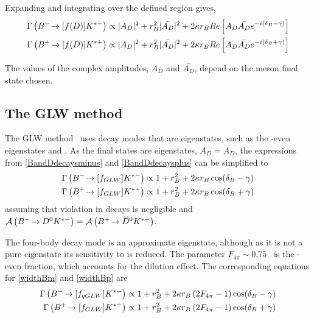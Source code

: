 Expanding and integrating over the defined \Kstar region gives,
\begin{align}
\Gamma\left({{{B}^-}}\!\rightarrow [f(D)]{\ensuremath{{K}^{*-}}}\right) &\propto |A_D|^2 + r_B^2 |\bar{A_{D}}|^2 + 2\kappa r_B Re\left[ A_D \bar{A_{D}} e^{-i(\delta_B - \gamma)} \right] \label{BandDdecaysminus} \\
\Gamma\left({{{B}^+}}\!\rightarrow [f(D)]{\ensuremath{{K}^{*+}}}\right) &\propto |A_D|^2 + r_B^2 |\bar{A_{D}}|^2 + 2\kappa r_B Re\left[ A_D \bar{A_{D}} e^{-i(\delta_B + \gamma)} \right] \label{BandDdecaysplus}
\end{align}

The values of the complex amplitudes, $A_{D}$ and $\bar{A_{D}}$, depend on the \D meson final state chosen.

\subsection{The GLW method}
\label{sec:theory:glw}

The GLW method~\cite{GL,GW} uses \D decay modes that are \CP eigenstates, such as the \CP-even eigenstates \decay{\D}{\Kp\Km} and \decay{\D}{\pip\pim}. As the final states are \CP eigenstates, $A_{D} = \bar{A_{D}}$, the expressions from \eqn\ref{BandDdecaysminus} and \ref{BandDdecaysplus} can be simplified to
\begin{align}
\Gamma\left({{{B}^-}}\!\rightarrow [f_{GLW}]{\ensuremath{{K}^{*-}}}\right) &\propto 1 + r_B^2 + 2\kappa r_B\cos(\delta_B - \gamma) \label{widthBm} \\
\Gamma\left({{{B}^+}}\!\rightarrow [f_{GLW}]{\ensuremath{{K}^{*+}}}\right) &\propto 1 + r_B^2 + 2\kappa r_B\cos(\delta_B + \gamma) \label{widthBp}
\end{align}
assuming that \CP violation in \D decays is negligible and $\mathcal{A}\left({{{B}^-}}\!\rightarrow {\ensuremath{{D}^0}}{\ensuremath{{K}^{*-}}}\right) = \mathcal{A}\left({{{B}^+}}\!\rightarrow {\ensuremath{{\kern 0.2em\overline{\kern -0.2em D}{}}{}^0}}{\ensuremath{{K}^{*+}}}\right)$. 

The four-body \D decay mode \decay{\D}{\pip\pim\pip\pim} is an approximate \CP eigenstate, although as it is not a pure \CP eigenstate its sensitivity to \Pgamma is reduced. The parameter $F_{4\pi} \sim 0.75$~\cite{charm4pi} is the \CP-even fraction, which accounts for the dilution effect. The corresponding equations for \ref{widthBm} and \ref{widthBp} are
\begin{align}
\Gamma\left({{{B}^-}}\!\rightarrow [f_{qGLW}]{\ensuremath{{K}^{*-}}}\right) \propto 1 + r_B^2 + 2\kappa r_B\left(2F_{4\pi} - 1\right)\cos(\delta_B - \gamma) \label{widthBm4body} \\
\Gamma\left({{{B}^+}}\!\rightarrow [f_{GLW}]{\ensuremath{{K}^{*+}}}\right) \propto 1 + r_B^2 + 2\kappa r_B\left(2F_{4\pi} - 1\right)\cos(\delta_B + \gamma) \label{widthBp4body}
\end{align}


